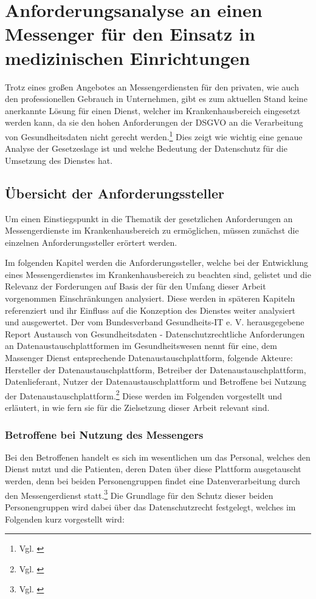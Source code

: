 \chapter{Anforderungsanalyse an einen Messenger für den Einsatz in medizinischen Einrichtungen}\label{chapter:ganforderungen}
Trotz eines großen Angebotes an Messengerdiensten für den privaten, wie auch den professionellen Gebrauch in Unternehmen, gibt es zum aktuellen Stand keine anerkannte Lösung für einen Dienst, welcher im Krankenhausbereich eingesetzt werden kann, da sie den hohen Anforderungen der DSGVO an die Verarbeitung von Gesundheitsdaten nicht gerecht werden.\footnote{Vgl. \cite[S. 1 ff.]{Datenschutzkonferenz2019}} Dies zeigt wie wichtig eine genaue Analyse der Gesetzeslage ist und welche Bedeutung der Datenschutz für die Umsetzung des Dienstes hat.

\section{Übersicht der Anforderungssteller}\label{chapter:hintergrund}
Um einen Einstiegspunkt in die Thematik der gesetzlichen Anforderungen an Messengerdienste im Krankenhausbereich zu ermöglichen, müssen zunächst die einzelnen Anforderungssteller erörtert werden.

Im folgenden Kapitel werden die Anforderungssteller, welche bei der Entwicklung eines Messengerdienstes im Krankenhausbereich zu beachten sind, gelistet und die Relevanz der Forderungen auf Basis der für den Umfang dieser Arbeit vorgenommen Einschränkungen analysiert. Diese werden in späteren Kapiteln referenziert und ihr Einfluss auf die Konzeption des Dienstes weiter analysiert und ausgewertet. Der vom Bundesverband Gesundheits-IT e. V. herausgegebene Report \glqq Austausch von Gesundheitsdaten - Datenschutzrechtliche Anforderungen an Datenaustauschplattformen im Gesundheitswesen\grqq{} nennt für eine, dem Massenger Dienst entsprechende Datenaustauschplattform, folgende Akteure: Hersteller der Datenaustauschplattform, Betreiber der Datenaustauschplattform, Datenlieferant, Nutzer der Datenaustauschplattform und Betroffene bei Nutzung der Datenaustauschplattform.\footnote{Vgl. \cite[S. 13]{Bundesverband-Gesundheits-IT-e.V.2016}} Diese werden im Folgenden vorgestellt und erläutert, in wie fern sie für die Zielsetzung dieser Arbeit relevant sind.

\subsection{Betroffene bei Nutzung des Messengers}\label{subsection:bbndd}
Bei den Betroffenen handelt es sich im wesentlichen um das Personal, welches den Dienst nutzt und die Patienten, deren Daten über diese Plattform ausgetauscht werden, denn bei beiden Personengruppen findet eine Datenverarbeitung durch den Messengerdienst statt.\footnote{Vgl. \cite[S. 13]{Bundesverband-Gesundheits-IT-e.V.2016}} Die Grundlage für den Schutz dieser beiden Personengruppen wird dabei über das Datenschutzrecht festgelegt, welches im Folgenden kurz vorgestellt wird:

